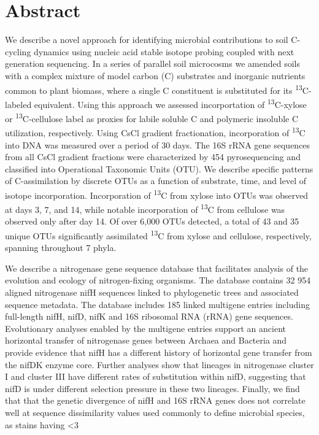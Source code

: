 \section{Abstract} 
We describe a novel approach for identifying microbial contributions to soil C-cycling dynamics using nucleic acid stable isotope probing coupled with next generation sequencing. In a series of parallel soil microcosms we amended soils with a complex mixture of model carbon (C) substrates and inorganic nutrients common to plant biomass, where a single C constituent is substituted for its \textsuperscript{13}C-labeled equivalent. Using this approach we assessed incorportation of \textsuperscript{13}C-xylose or \textsuperscript{13}C-cellulose label as proxies for labile soluble C and polymeric insoluble C utilization, respectively. Using CsCl gradient fractionation, incorporation of \textsuperscript{13}C into DNA was measured over a period of 30 days. The 16S rRNA gene sequences from all CsCl gradient fractions were characterized by 454 pyrosequencing and classified into Operational Taxonomic Units (OTU). We describe specific patterns of C-assimilation by discrete OTUs as a function of substrate, time, and level of isotope incorporation. Incorporation of \textsuperscript{13}C from xylose into OTUs was observed at days 3, 7, and 14, while notable incorporation of \textsuperscript{13}C from cellulose was observed only after day 14. Of over 6,000 OTUs detected, a total of 43 and 35 unique OTUs significantly assimilated \textsuperscript{13}C from xylose and cellulose, respectively, spanning throughout 7 phyla.  

We describe a nitrogenase gene sequence database that facilitates analysis of the evolution and ecology of nitrogen-fixing organisms. The database contains 32 954 aligned nitrogenase nifH sequences linked to phylogenetic trees and associated sequence metadata. The database includes 185 linked multigene entries including full-length nifH, nifD, nifK and 16S ribosomal RNA (rRNA) gene sequences. Evolutionary analyses enabled by the multigene entries support an ancient horizontal transfer of nitrogenase genes between Archaea and Bacteria and provide evidence that nifH has a different history of horizontal gene transfer from the nifDK enzyme core. Further analyses show that lineages in nitrogenase cluster I and cluster III have different rates of substitution within nifD, suggesting that nifD is under different selection pressure in these two lineages. Finally, we find that that the genetic divergence of nifH and 16S rRNA genes does not correlate well at sequence dissimilarity values used commonly to define microbial species, as stains having <3%